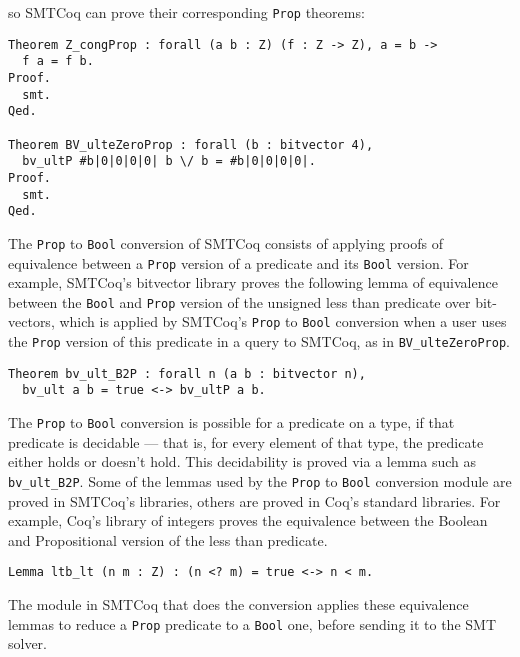 \documentclass[11pt]{article}
\begin{document}
	so SMTCoq can prove their 
	corresponding \texttt{Prop}
	theorems:
	\begin{verbatim}
Theorem Z_congProp : forall (a b : Z) (f : Z -> Z), a = b -> 
  f a = f b.
Proof.
  smt.
Qed.
	
Theorem BV_ulteZeroProp : forall (b : bitvector 4), 
  bv_ultP #b|0|0|0|0| b \/ b = #b|0|0|0|0|.
Proof.
  smt.
Qed.
	\end{verbatim}
	The	\texttt{Prop} to \texttt{Bool} 
	conversion of SMTCoq consists of 
	applying proofs of equivalence 
	between a \texttt{Prop} version
	of a predicate and its \texttt{Bool}
	version. For example, SMTCoq's 
	bitvector library proves the 
	following lemma of equivalence 
	between the \texttt{Bool}
	and \texttt{Prop} version of the 
	unsigned less than predicate over
	bit-vectors, which is applied 
	by SMTCoq's \texttt{Prop} to 
	\texttt{Bool} conversion when 
	a user uses the \texttt{Prop}
	version of this predicate in a 
	query to SMTCoq, as in 
	\texttt{BV\_ulteZeroProp}.
	\begin{verbatim}
Theorem bv_ult_B2P : forall n (a b : bitvector n), 
  bv_ult a b = true <-> bv_ultP a b.
	\end{verbatim}
	The \texttt{Prop} to \texttt{Bool}
	conversion is possible for a predicate 
	on a type, if that predicate is 
	decidable --- that is, for every 
	element of that type, the predicate 
	either holds or doesn't hold. This 
	decidability is proved via a lemma 
	such as \texttt{bv\_ult\_B2P}. Some
	of the lemmas used by the 
	\texttt{Prop} to \texttt{Bool} 
	conversion module are proved in SMTCoq's
	libraries, others are proved in 
	Coq's standard libraries. For 
	example, Coq's library of integers
	proves the equivalence between the 
	Boolean and Propositional version 
	of the less than predicate.
	\begin{verbatim}
Lemma ltb_lt (n m : Z) : (n <? m) = true <-> n < m.
	\end{verbatim}
	The module in SMTCoq that does
	the conversion applies these 
	equivalence lemmas to reduce a 
	\texttt{Prop} predicate to a 
	\texttt{Bool} one, before sending 
	it to the SMT solver.	
	
	


\end{document}
